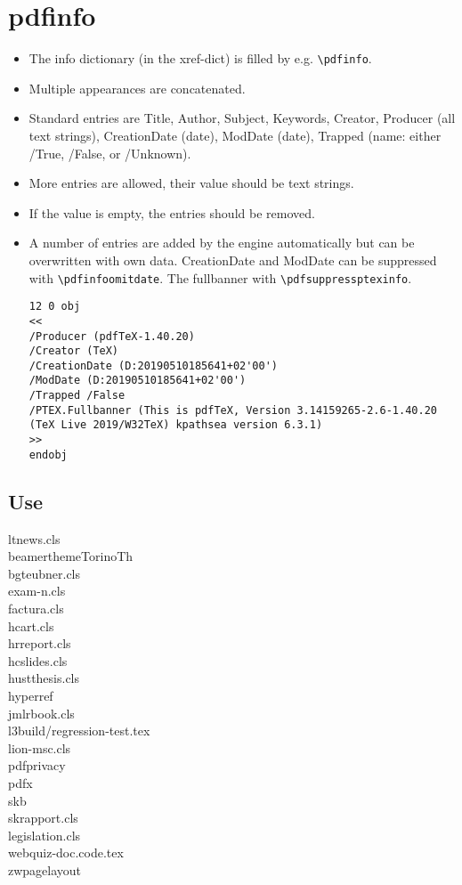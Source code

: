 \documentclass{article}
\begin{document}
\section{pdfinfo}
\begin{itemize}
\item The info dictionary (in the xref-dict) is filled by e.g. \verb+\pdfinfo+.
\item Multiple appearances are concatenated.
\item Standard entries are Title, Author, Subject, Keywords, Creator, Producer (all text strings), CreationDate (date), ModDate (date), Trapped (name: either /True, /False, or /Unknown).
\item More entries are allowed, their value should be text strings.
\item If the value is empty, the entries should be removed.
\item A number of entries are added by the engine automatically but can be overwritten with own data.
CreationDate and ModDate can be suppressed with \verb+\pdfinfoomitdate+. The fullbanner with \verb+\pdfsuppressptexinfo+.
\begin{verbatim}
12 0 obj
<<
/Producer (pdfTeX-1.40.20)
/Creator (TeX)
/CreationDate (D:20190510185641+02'00')
/ModDate (D:20190510185641+02'00')
/Trapped /False
/PTEX.Fullbanner (This is pdfTeX, Version 3.14159265-2.6-1.40.20 (TeX Live 2019/W32TeX) kpathsea version 6.3.1)
>>
endobj
\end{verbatim}
\end{itemize}

\subsection{Use}
\begin{description}
  \item[ltnews.cls]
  \item[beamerthemeTorinoTh]
  \item[bgteubner.cls]
  \item[exam-n.cls]
  \item[factura.cls]
  \item[hcart.cls]
  \item[hrreport.cls]
  \item[hcslides.cls]
  \item[hustthesis.cls]
  \item[hyperref]
  \item[jmlrbook.cls]
  \item[l3build/regression-test.tex]
  \item[lion-msc.cls]
  \item[pdfprivacy]
  \item[pdfx]
  \item[skb]
  \item[skrapport.cls]
  \item[legislation.cls]
  \item[webquiz-doc.code.tex]
  \item[zwpagelayout]

\end{description}
\end{document}
